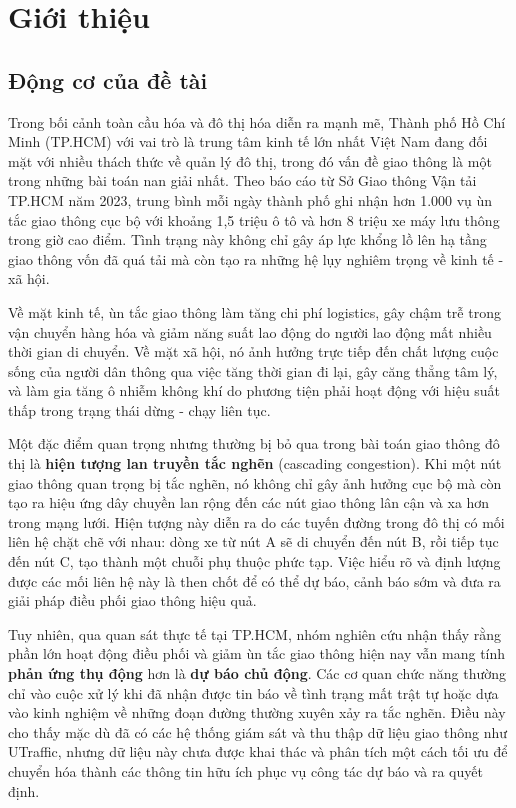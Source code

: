 \clearpage
\section{Giới thiệu}
\subsection{Động cơ của đề tài}
Trong bối cảnh toàn cầu hóa và đô thị hóa diễn ra mạnh mẽ, Thành phố Hồ Chí Minh (TP.HCM) với vai trò là trung tâm kinh tế lớn nhất Việt Nam đang đối mặt với nhiều thách thức về quản lý đô thị, trong đó vấn đề giao thông là một trong những bài toán nan giải nhất. Theo báo cáo từ Sở Giao thông Vận tải TP.HCM năm 2023, trung bình mỗi ngày thành phố ghi nhận hơn 1.000 vụ ùn tắc giao thông cục bộ với khoảng 1,5 triệu ô tô và hơn 8 triệu xe máy lưu thông trong giờ cao điểm. Tình trạng này không chỉ gây áp lực khổng lồ lên hạ tầng giao thông vốn đã quá tải mà còn tạo ra những hệ lụy nghiêm trọng về kinh tế - xã hội.

Về mặt kinh tế, ùn tắc giao thông làm tăng chi phí logistics, gây chậm trễ trong vận chuyển hàng hóa và giảm năng suất lao động do người lao động mất nhiều thời gian di chuyển. Về mặt xã hội, nó ảnh hưởng trực tiếp đến chất lượng cuộc sống của người dân thông qua việc tăng thời gian đi lại, gây căng thẳng tâm lý, và làm gia tăng ô nhiễm không khí do phương tiện phải hoạt động với hiệu suất thấp trong trạng thái dừng - chạy liên tục.

Một đặc điểm quan trọng nhưng thường bị bỏ qua trong bài toán giao thông đô thị là \textbf{hiện tượng lan truyền tắc nghẽn} (cascading congestion). Khi một nút giao thông quan trọng bị tắc nghẽn, nó không chỉ gây ảnh hưởng cục bộ mà còn tạo ra hiệu ứng dây chuyền lan rộng đến các nút giao thông lân cận và xa hơn trong mạng lưới. Hiện tượng này diễn ra do các tuyến đường trong đô thị có mối liên hệ chặt chẽ với nhau: dòng xe từ nút A sẽ di chuyển đến nút B, rồi tiếp tục đến nút C, tạo thành một chuỗi phụ thuộc phức tạp. Việc hiểu rõ và định lượng được các mối liên hệ này là then chốt để có thể dự báo, cảnh báo sớm và đưa ra giải pháp điều phối giao thông hiệu quả.

Tuy nhiên, qua quan sát thực tế tại TP.HCM, nhóm nghiên cứu nhận thấy rằng phần lớn hoạt động điều phối và giảm ùn tắc giao thông hiện nay vẫn mang tính \textbf{phản ứng thụ động} hơn là \textbf{dự báo chủ động}. Các cơ quan chức năng thường chỉ vào cuộc xử lý khi đã nhận được tin báo về tình trạng mất trật tự hoặc dựa vào kinh nghiệm về những đoạn đường thường xuyên xảy ra tắc nghẽn. Điều này cho thấy mặc dù đã có các hệ thống giám sát và thu thập dữ liệu giao thông như UTraffic, nhưng dữ liệu này chưa được khai thác và phân tích một cách tối ưu để chuyển hóa thành các thông tin hữu ích phục vụ công tác dự báo và ra quyết định.


